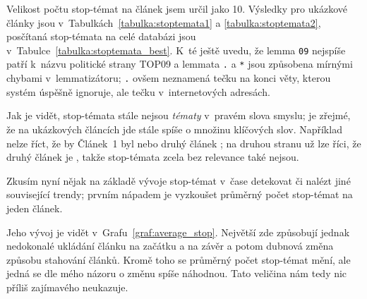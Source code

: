 \documentclass[12pt,a4paper]{report}
\begin{document}



Velikost počtu stop-témat na článek jsem určil jako 10. Výsledky pro ukázkové články jsou v~Tabulkách~\ref{tabulka:stoptemata1} a \ref{tabulka:stoptemata2}, posčítaná stop-témata na celé databázi jsou v~Tabulce~\ref{tabulka:stoptemata_best}. K~té ještě uvedu, že lemma \texttt{09} nejspíše patří k~názvu politické strany TOP09 a lemmata \texttt{.} a \texttt{*} jsou způsobena mírnými chybami v~lemmatizátoru; \texttt{.} ovšem neznamená tečku na konci věty, kterou systém úspěšně ignoruje, ale tečku v~internetových adresách.

Jak je vidět, stop-témata stále nejsou \emph{tématy} v~pravém slova smyslu; je zřejmé, že na ukázkových článcích jde stále spíše o množinu klíčových slov. Například nelze říct, že by Článek~1 byl  nebo druhý článek ; na druhou stranu už lze říci, že druhý článek je , takže stop-témata zcela bez relevance také nejsou.

Zkusím nyní nějak na základě vývoje stop-témat v~čase detekovat  či nalézt jiné související trendy; prvním nápadem je vyzkoušet průměrný počet stop-témat na jeden článek.


Jeho vývoj je vidět v~Grafu~\ref{graf:average_stop}. Největší  zde způsobují jednak nedokonalé ukládání článku na začátku a na závěr a potom dubnová změna způsobu stahování článků. Kromě toho se průměrný počet stop-témat mění, ale jedná se dle mého názoru o změnu spíše náhodnou. Tato veličina nám tedy nic příliš zajímavého neukazuje.
\end{document}

